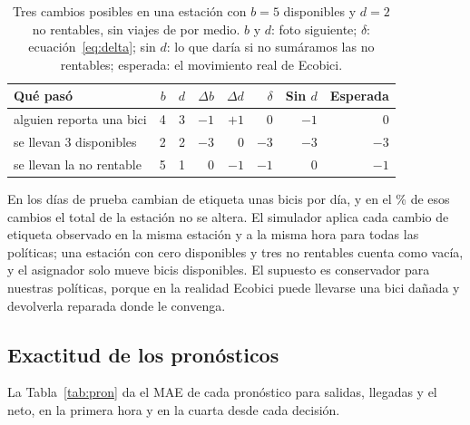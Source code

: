 \documentclass[conference,letterpaper,10pt]{IEEEtran}
\begin{document}
\begin{table}[H]
\centering\footnotesize
\setlength{\tabcolsep}{3.5pt}
\caption{Tres cambios posibles en una estación con $b=5$ disponibles y $d=2$ no rentables, sin viajes de por medio. $b$ y $d$: foto siguiente; $\delta$: ecuación~\eqref{eq:delta}; sin $d$: lo que daría si no sumáramos las no rentables; esperada: el movimiento real de Ecobici.}
\label{tab:etiqueta}
\begin{tabular}{@{}lrrrrrrr@{}}
\toprule
Qué pasó & $b$ & $d$ & $\Delta b$ & $\Delta d$ & $\delta$ & Sin $d$ & Esperada \\
\midrule
alguien reporta una bici & 4 & 3 & $-1$ & $+1$ & 0 & $-1$ & 0 \\
se llevan 3 disponibles & 2 & 2 & $-3$ & 0 & $-3$ & $-3$ & $-3$ \\
se llevan la no rentable & 5 & 1 & 0 & $-1$ & $-1$ & 0 & $-1$ \\
\bottomrule
\end{tabular}
\end{table}


En los \rdias{} días de prueba cambian de etiqueta unas \retiquetasDia{} bicis por día, y en el \renSitioPct\% de esos cambios el total de la estación no se altera. El simulador aplica cada cambio de etiqueta observado en la misma estación y a la misma hora para todas las políticas; una estación con cero disponibles y tres no rentables cuenta como vacía, y el asignador solo mueve bicis disponibles. El supuesto es conservador para nuestras políticas, porque en la realidad Ecobici puede llevarse una bici dañada y devolverla reparada donde le convenga.

\subsection{Exactitud de los pronósticos}
La Tabla~\ref{tab:pron} da el MAE de cada pronóstico para salidas, llegadas y el neto, en la primera hora y en la cuarta desde cada decisión.

\begin{table}[H]
\centering\footnotesize
\setlength{\tabcolsep}{3.5pt}
\caption{Exactitud de cada pronóstico en los \cfMeses{} meses de prueba, por estación y por hora. MAE en viajes; neto: llegadas menos salidas.}
\label{tab:pron}

\end{table}
\end{document}
